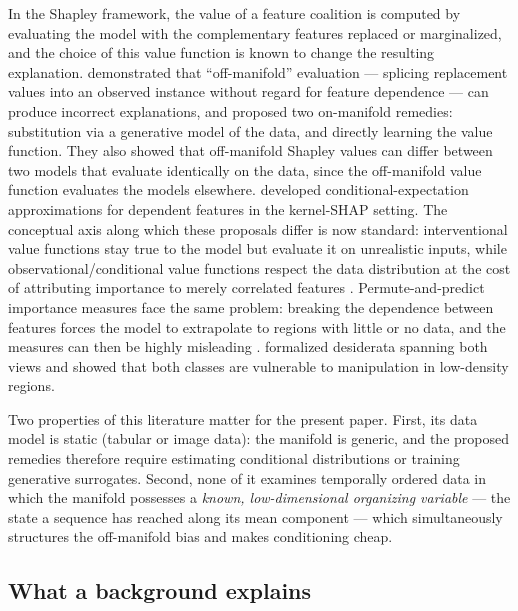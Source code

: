 \documentclass{article}
\begin{document}
In the Shapley framework, the value of a feature coalition is computed by evaluating the model with the complementary features replaced or marginalized, and the choice of this value function is known to change the resulting explanation. \citet{frye2021shapley} demonstrated that ``off-manifold'' evaluation --- splicing replacement values into an observed instance without regard for feature dependence --- can produce incorrect explanations, and proposed two on-manifold remedies: substitution via a generative model of the data, and directly learning the value function. They also showed that off-manifold Shapley values can differ between two models that evaluate identically on the data, since the off-manifold value function evaluates the models elsewhere. \citet{aas2021explaining} developed conditional-expectation approximations for dependent features in the kernel-SHAP setting. The conceptual axis along which these proposals differ is now standard: interventional value functions stay true to the model but evaluate it on unrealistic inputs, while observational/conditional value functions respect the data distribution at the cost of attributing importance to merely correlated features \citep{chen2020true, janzing2020feature, sundararajan2020many}. Permute-and-predict importance measures face the same problem: breaking the dependence between features forces the model to extrapolate to regions with little or no data, and the measures can then be highly misleading \citep{hooker2021unrestricted}. \citet{yeh2022threading} formalized desiderata spanning both views and showed that both classes are vulnerable to manipulation in low-density regions.

Two properties of this literature matter for the present paper. First, its data model is static (tabular or image data): the manifold is generic, and the proposed remedies therefore require estimating conditional distributions or training generative surrogates. Second, none of it examines temporally ordered data in which the manifold possesses a \emph{known, low-dimensional organizing variable} --- the state a sequence has reached along its mean component --- which simultaneously structures the off-manifold bias and makes conditioning cheap.


\subsection{What a background explains}\label{sec:related:background}
\end{document}

